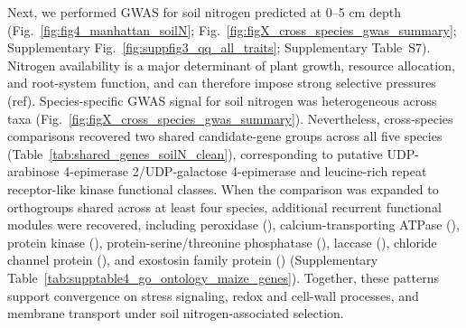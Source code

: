 \documentclass[unnumsec,webpdf,contemporary,large]{oup-authoring-template}%
\theoremstyle{thmstyleone}%
\theoremstyle{thmstyletwo}%
\theoremstyle{thmstylethree}%
\begin{document}
Next, we performed GWAS for soil nitrogen predicted at 0--5 cm depth (Fig.~\ref{fig:fig4_manhattan_soilN}; Fig.~\ref{fig:figX_cross_species_gwas_summary}; Supplementary Fig.~\ref{fig:suppfig3_qq_all_traits}; Supplementary Table~S7). Nitrogen availability is a major determinant of plant growth, resource allocation, and root-system function, and can therefore impose strong selective pressures (ref). Species-specific GWAS signal for soil nitrogen was heterogeneous across taxa (Fig.~\ref{fig:figX_cross_species_gwas_summary}). Nevertheless, cross-species comparisons recovered two shared candidate-gene groups across all five species (Table~\ref{tab:shared_genes_soilN_clean}), corresponding to putative UDP-arabinose 4-epimerase 2/UDP-galactose 4-epimerase and leucine-rich repeat receptor-like kinase functional classes. When the comparison was expanded to orthogroups shared across at least four species, additional recurrent functional modules were recovered, including peroxidase (\textit{}), calcium-transporting ATPase (\textit{}), protein kinase (\textit{}), protein-serine/threonine phosphatase (\textit{}), laccase (\textit{}), chloride channel protein (\textit{}), and exostosin family protein (\textit{}) (Supplementary Table~\ref{tab:supptable4_go_ontology_maize_genes}). Together, these patterns support convergence on stress signaling, redox and cell-wall processes, and membrane transport under soil nitrogen-associated selection.
\end{document}
